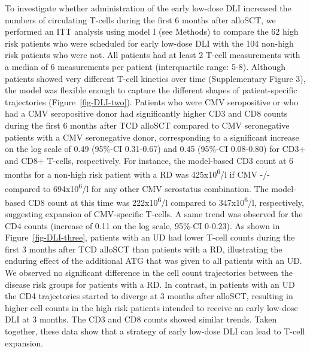 \documentclass[
  letterpaper,
  paper=240mm:170mm,
  twoside=true,
  open=right,
  fontsize=10pt,
  pagesize=false,
  BCOR=15mm,
  DIV=14,
  headinclude=true,
  footinclude=false,
  headsepline=on]{scrbook}
\begin{document}
To investigate whether administration of the early low-dose DLI
increased the numbers of circulating T-cells during the first 6 months
after alloSCT, we performed an ITT analysis using model I (see Methods)
to compare the 62 high risk patients who were scheduled for early
low-dose DLI with the 104 non-high risk patients who were not. All
patients had at least 2 T-cell measurements with a median of 6
measurements per patient (interquartile range: 5-8). Although patients
showed very different T-cell kinetics over time (Supplementary Figure
3), the model was flexible enough to capture the different shapes of
patient-specific trajectories (Figure~\ref{fig-DLI-two}). Patients who
were CMV seropositive or who had a CMV seropositive donor had
significantly higher CD3 and CD8 counts during the first 6 months after
TCD alloSCT compared to CMV seronegative patients with a CMV
seronegative donor, corresponding to a significant increase on the log
scale of 0.49 (95\%-CI 0.31-0.67) and 0.45 (95\%-CI 0.08-0.80) for CD3+
and CD8+ T-cells, respectively. For instance, the model-based CD3 count
at 6 months for a non-high risk patient with a RD was
425x10\textsuperscript{6}/l if CMV -/- compared to
694x10\textsuperscript{6}/l for any other CMV serostatus combination.
The model-based CD8 count at this time was 222x10\textsuperscript{6}/l
compared to 347x10\textsuperscript{6}/l, respectively, suggesting
expansion of CMV-specific T-cells. A same trend was observed for the CD4
counts (increase of 0.11 on the log scale, 95\%-CI 0-0.23). As shown in
Figure~\ref{fig-DLI-three}, patients with an UD had lower T-cell counts
during the first 3 months after TCD alloSCT than patients with a RD,
illustrating the enduring effect of the additional ATG that was given to
all patients with an UD. We observed no significant difference in the
cell count trajectories between the disease risk groups for patients
with a RD. In contrast, in patients with an UD the CD4 trajectories
started to diverge at 3 months after alloSCT, resulting in higher cell
counts in the high risk patients intended to receive an early low-dose
DLI at 3 months. The CD3 and CD8 counts showed similar trends. Taken
together, these data show that a strategy of early low-dose DLI can lead
to T-cell expansion.
\end{document}
